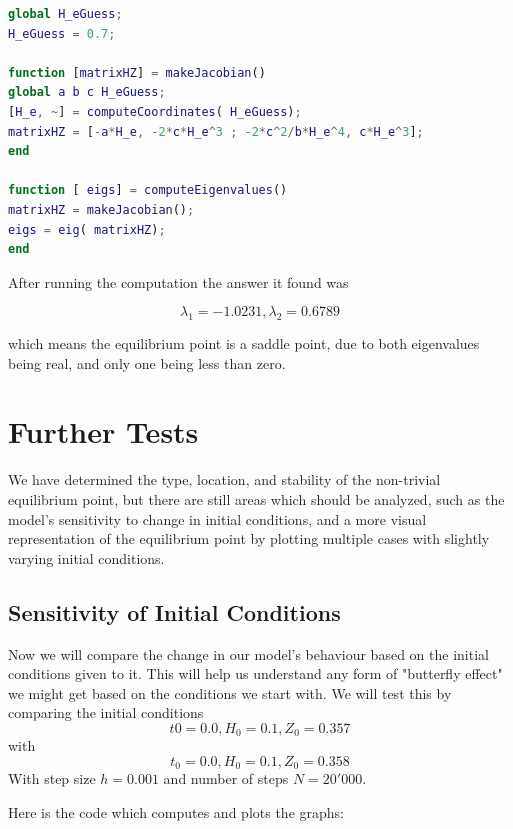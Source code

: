 \documentclass[11pt]{article}
\begin{document}
\begin{lstlisting}[language = Matlab]
global H_eGuess;
H_eGuess = 0.7;

function [matrixHZ] = makeJacobian()
global a b c H_eGuess;
[H_e, ~] = computeCoordinates( H_eGuess);
matrixHZ = [-a*H_e, -2*c*H_e^3 ; -2*c^2/b*H_e^4, c*H_e^3];
end

function [ eigs] = computeEigenvalues()
matrixHZ = makeJacobian();
eigs = eig( matrixHZ);
end
\end{lstlisting}

After running the computation the answer it found was 

\begin{equation}
\lambda_1 = -1.0231, \lambda_2 = 0.6789
\end{equation}

which means the equilibrium point is a saddle point, due to both eigenvalues being real, and only one being less than zero.

\section{Further Tests}
We have determined the type, location, and stability of the non-trivial equilibrium point, but there are still areas which should be analyzed, such as the model's sensitivity to change in initial conditions, and a more visual representation of the equilibrium point by plotting multiple cases with slightly varying initial conditions.

\subsection{Sensitivity of Initial Conditions}
Now we will compare the change in our model's behaviour based on the initial conditions given to it. This will help us understand any form of "butterfly effect" we might get based on the conditions we start with. We will test this by comparing the initial conditions
\[
t0=0.0, H_0=0.1, Z_0=0.357 
\]
with
\[ 
t_0=0.0, H_0=0.1, Z_0=0.358
\]
With step size $h = 0.001$ and number of steps $N=20'000$.

Here is the code which computes and plots the graphs:
\end{document}

